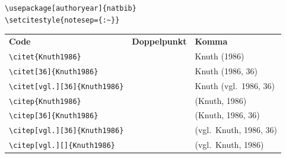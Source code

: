 \begin{frame}[fragile]


\begin{lstlisting}
\usepackage[authoryear]{natbib}
\setcitestyle{notesep={:~}}
\end{lstlisting}

\footnotesize

\begin{tabular}{lll}
	\textbf{Code}                               & \textbf{Doppelpunkt}            & \textbf{Komma} \\
	
	\lstinline|\citet{Knuth1986}|               & \citet{Knuth1986}               & Knuth (1986)   \\
	
	\lstinline|\citet[36]{Knuth1986}|           & \citet[36]{Knuth1986}           & Knuth (1986, 36)   \\
	
	\lstinline|\citet[vgl.][36]{Knuth1986}| & \citet[vgl.][36]{Knuth1986} & Knuth (vgl.\ 1986, 36)  \\
	
	\lstinline|\citep{Knuth1986}|               & \citep{Knuth1986}               & (Knuth, 1986)   \\
	
	\lstinline|\citep[36]{Knuth1986}|     & \citep[36]{Knuth1986}           & (Knuth, 1986, 36) \\
	
	\lstinline|\citep[vgl.][36]{Knuth1986}|       & \citep[vgl.][36]{Knuth1986}     & (vgl.\ Knuth, 1986, 36)   \\
	
	\lstinline|\citep[vgl.][]{Knuth1986}|           & \citep[vgl.][]{Knuth1986}       & (vgl.\ Knuth, 1986)
\end{tabular}

\end{frame}


